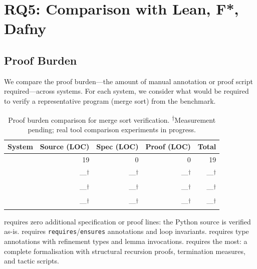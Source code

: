 \documentclass[11pt]{article}
\begin{document}
\section{RQ5: Comparison with Lean, F*, Dafny}\label{sec:rq5}

\subsection{Proof Burden}

We compare the proof burden---the amount of manual annotation or
proof script required---across systems.  For each system, we
consider what would be required to verify a representative program
(merge sort) from the benchmark.

\begin{table}[H]
\centering
\caption{Proof burden comparison for merge sort verification.
  \textsuperscript{$\dagger$}Measurement pending; real tool comparison experiments in progress.}\label{tab:burden}
\begin{tabular}{@{}l r r r r@{}}
\toprule
\textbf{System} & \textbf{Source (LOC)} & \textbf{Spec (LOC)}
  & \textbf{Proof (LOC)} & \textbf{Total} \\
\midrule
\JuGeo{} & 19 &  0 & 0  & 19 \\
\Dafny{} & ---\textsuperscript{$\dagger$} & ---\textsuperscript{$\dagger$} & ---\textsuperscript{$\dagger$} & ---\textsuperscript{$\dagger$} \\
\Fstar{} & ---\textsuperscript{$\dagger$} & ---\textsuperscript{$\dagger$} & ---\textsuperscript{$\dagger$} & ---\textsuperscript{$\dagger$} \\
\LEAN{}  & ---\textsuperscript{$\dagger$} & ---\textsuperscript{$\dagger$} & ---\textsuperscript{$\dagger$} & ---\textsuperscript{$\dagger$} \\
\bottomrule
\end{tabular}
\end{table}

\JuGeo{} requires zero additional specification or proof lines:
the Python source is verified as-is.  \Dafny{} requires
\texttt{requires}/\texttt{ensures} annotations and loop invariants.
\Fstar{} requires type annotations with refinement types and
lemma invocations.  \LEAN{} requires the most: a complete
formalisation with structural recursion proofs, termination measures,
and tactic scripts.
\end{document}
